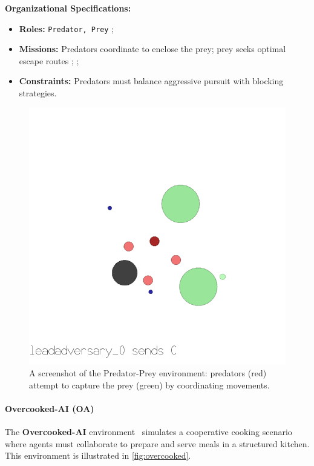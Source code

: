 \documentclass[pdflatex,sn-mathphys-num]{sn-jnl}%
\theoremstyle{thmstyleone}%
\theoremstyle{thmstyletwo}%
\theoremstyle{thmstylethree}%
\begin{document}
\textbf{Organizational Specifications:} 
\begin{itemize}
    \item \textbf{Roles:} \texttt{Predator, Prey} ;
    \item \textbf{Missions:} Predators coordinate to enclose the prey; prey seeks optimal escape routes ; ;
    \item \textbf{Constraints:} Predators must balance aggressive pursuit with blocking strategies.
\end{itemize}

\begin{figure}[h!]
    \centering
    \includegraphics[width=0.7\linewidth]{figures/predator_prey.png}
    \caption{A screenshot of the Predator-Prey environment: predators (red) attempt to capture the prey (green) by coordinating movements.}
    \label{fig:predator_prey}
\end{figure}

\paragraph{Overcooked-AI (OA)}
The \textbf{Overcooked-AI} environment~\cite{overcookedai} simulates a cooperative cooking scenario where agents must collaborate to prepare and serve meals in a structured kitchen. This environment is illustrated in \autoref{fig:overcooked}.
\end{document}
